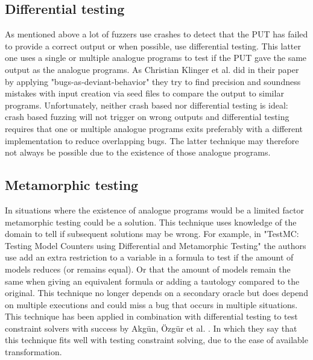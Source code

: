 \subsection{Differential testing}
\label{fuzzing:DifferentialTesting}
As mentioned above a lot of fuzzers use crashes to detect that the PUT has failed to provide a correct output or when possible, use differential testing. This latter one uses a single or multiple analogue programs to test if the PUT gave the same output as the analogue programs. As Christian Klinger et al. did in their paper \cite{48klinger2019differentially} by applying "bugs-as-deviant-behavior" they try to find precision and soundness mistakes with input creation via seed files to compare the output to similar programs. 
Unfortunately, neither crash based nor differential testing is ideal: crash based fuzzing will not trigger on wrong outputs and differential testing requires that one or multiple analogue programs exits preferably with a different implementation to reduce overlapping bugs. The latter technique may therefore not always be possible due to the existence of those analogue programs.

\subsection{Metamorphic testing}
\label{fuzzing:MetamorphicTesting}
In situations where the existence of analogue programs would be a limited factor metamorphic testing could be a solution. This technique uses knowledge of the domain to tell if subsequent solutions may be wrong. For example, in "TestMC: Testing Model Counters using Differential and Metamorphic Testing" \cite{49usman2020testmc} the authors use add an extra restriction to a variable in a formula to test if the amount of models reduces (or remains equal). Or that the amount of models remain the same when giving an equivalent formula or adding a tautology compared to the original. This technique no longer depends on a secondary oracle but does depend on multiple executions and could miss a bug that occurs in multiple situations. This technique has been applied in combination with differential testing to test constraint solvers with success by Akg{\"u}n, {\"O}zg{\"u}r et al. \cite{50akgun2018metamorphic}. In which they say that this technique fits well with testing constraint solving, due to the ease of available transformation.

